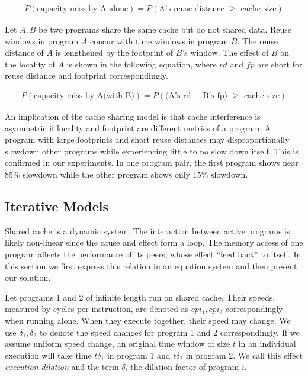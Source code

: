 \begin{equation*}
\begin{array}{l}
  P(\mbox{capacity miss by A alone}) = P(\mbox{A's reuse distance $\ge$ cache size})
\end{array}
\end{equation*}

Let $A,B$ be two programs share the same cache but do not shared
data. Reuse windows in program $A$ concur with time windows in program
$B$.  The reuse distance of $A$ is lengthened by the footprint of
$B$'s window. The effect of $B$ on the locality of $A$ is shown in the
following equation, where $rd$ and $fp$ are short for reuse distance
and footprint correspondingly.  

\begin{equation*}
\begin{array}{l}
 P(\mbox{capacity miss by A(with B)}) = P(\mbox{(A's rd + B's fp) $\ge$ cache size})
\end{array}
\end{equation*}

An implication of the cache sharing model is that cache interference
is asymmetric if locality and footprint are different metrics of a
program.  A program with large footprints and short reuse distances may
disproportionally slowdown other programs while experiencing little to
no slow down itself.  This is confirmed in our experiments.  In one
program pair, the first program shows near 85\% slowdown while the
other program shows only 15\% slowdown.

\subsection{Iterative Models}

Shared cache is a dynamic system.  The interaction between active
programs is likely non-linear since the cause and effect form a loop.
The memory access of one program affects the performance of its peers,
whose effect ``feed back'' to itself.  In this section we first
express this relation in an equation system and then present our
solution.

Let programs 1 and 2 of infinite length run on shared cache. Their
speeds, measured by cycles per instruction, are denoted as $cpi_1,
cpi_2$ correspondingly when running alone. When they execute together,
their speed may change. We use $\delta_1, \delta_2$ to denote the
speed changes for program 1 and 2 correspondingly. If we assume
uniform speed change, an original time window of size $t$ in an
individual execution will take time $t\delta_1$ in program 1 and
$t\delta_2$ in program 2. We call this effect \emph{execution
  dilation} and the term $\delta_i$ the dilation factor of program
$i$. 

